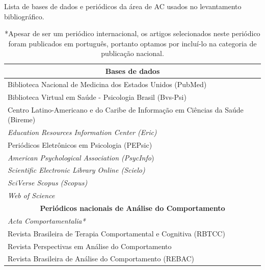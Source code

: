 \begin{table}[]
\caption{Lista de bases de dados e periódicos da área de AC usados no levantamento bibliográfico.}
\begin{adjustbox}{max width=1\textwidth}
\begin{tabular}{@{}l@{}}
\toprule
\multicolumn{1}{c}{\textbf{Bases de dados}}                                     \\ \midrule
Biblioteca Nacional de Medicina dos Estados Unidos (PubMed)                     \\
Biblioteca Virtual em Saúde - Psicologia Brasil (Bvs-Psi)                       \\
Centro Latino-Americano e do Caribe de Informação em Ciências da	Saúde (Bireme) \\
\textit{Education Resources Information Center  (Eric)}                                  \\
Periódicos Eletrônicos em Psicologia (PEPsic)                                   \\
\textit{American Psychological Association (PsycInfo})                                   \\
\textit{Scientific	Electronic Library Online (Scielo) }                                  \\
\textit{SciVerse Scopus (Scopus)}                                                        \\
\textit{Web	of Science}                                                               \\ \midrule
\multicolumn{1}{c}{\textbf{Periódicos nacionais de Análise do Comportamento}}   \\ \midrule
\textit{\textit{Acta Comportamentalia*}}                                                 \\
Revista Brasileira de Terapia Comportamental e Cognitiva (RBTCC)                \\
Revista Perspectivas em Análise do Comportamento                                \\
Revista Brasileira de Análise do Comportamento (REBAC)                          \\ \bottomrule
\end{tabular}
\end{adjustbox}
\caption*{*Apesar de ser um periódico internacional, os artigos selecionados neste periódico foram publicados em português, portanto optamos por incluí-lo na categoria de publicação nacional.}
\end{table}

